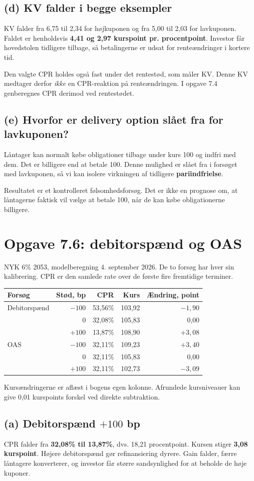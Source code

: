 \documentclass[11pt,a4paper]{article}
\newcommand{\opgave}[1]{\section*{#1}}
\newcommand{\del}[1]{\subsection*{#1}}
\begin{document}
\del{(d) KV falder i begge eksempler}
KV falder fra 6,75 til 2,34 for højkuponen og fra 5,00 til 2,03 for lavkuponen. Faldet er henholdsvis \textbf{4,41 og 2,97 kurspoint pr. procentpoint}. Investor får hovedstolen tidligere tilbage, så betalingerne er udsat for renteændringer i kortere tid.

Den valgte CPR holdes også fast under det rentestød, som måler KV. Denne KV medtager derfor \emph{ikke} en CPR-reaktion på renteændringen. I opgave 7.4 genberegnes CPR derimod ved rentestødet.

\del{(e) Hvorfor er delivery option slået fra for lavkuponen?}
Låntager kan normalt købe obligationer tilbage under kurs 100 og indfri med dem. Det er billigere end at betale 100. Denne mulighed er slået fra i forsøget med lavkuponen, så vi kan isolere virkningen af tidligere \textbf{pariindfrielse}.

Resultatet er et kontrolleret følsomhedsforsøg. Det er ikke en prognose om, at låntagerne faktisk vil vælge at betale 100, når de kan købe obligationerne billigere.

\newpage
\opgave{Opgave 7.6: debitorspænd og OAS}
\begin{tcolorbox}[title=Opgavebeskrivelse]
NYK 6\% 2053, modelberegning 4. september 2026. De to forsøg har hver sin kalibrering. CPR er den samlede rate over de første fire fremtidige terminer.
\begin{center}\small\begin{tabular}{lrrrr}\toprule
Forsøg & Stød, bp & CPR & Kurs & Ændring, point\\\midrule
Debitorspænd & $-100$ & 53,56\% & 103,92 & $-1{,}90$\\
 & 0 & 32,08\% & 105,83 & 0,00\\
 & $+100$ & 13,87\% & 108,90 & $+3{,}08$\\\midrule
OAS & $-100$ & 32,11\% & 109,23 & $+3{,}40$\\
 & 0 & 32,11\% & 105,83 & 0,00\\
 & $+100$ & 32,11\% & 102,73 & $-3{,}09$\\\bottomrule
\end{tabular}\end{center}
Kursændringerne er aflæst i bogens egen kolonne. Afrundede kursniveauer kan give 0,01 kurspoints forskel ved direkte subtraktion.
\end{tcolorbox}
\del{(a) Debitorspænd $+100$ bp}
CPR falder fra \textbf{32,08\% til 13,87\%}, dvs. 18,21 procentpoint. Kursen stiger \textbf{3,08 kurspoint}. Højere debitorspænd gør refinansiering dyrere. Gain falder, færre låntagere konverterer, og investor får større sandsynlighed for at beholde de høje kuponer.
\end{document}
